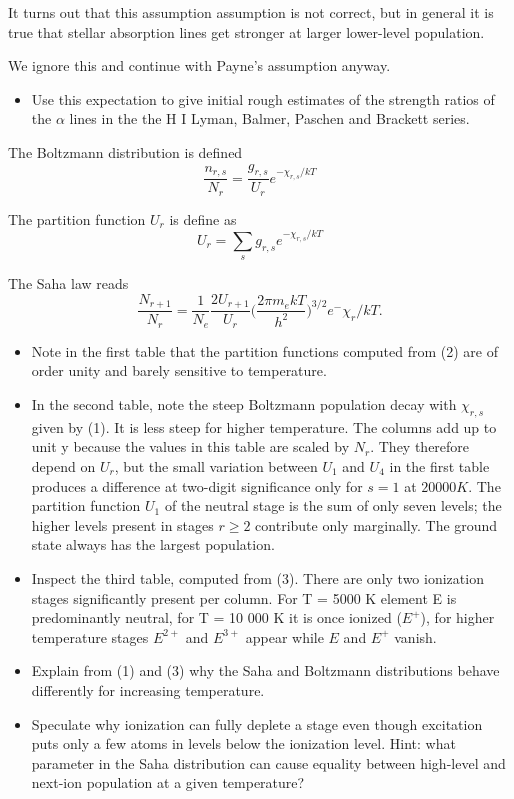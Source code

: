 \documentclass{aa}   %
\begin{document}
It turns out that this assumption assumption is not correct, but in general it is true that stellar absorption lines get stronger at larger lower-level population. 

We ignore this and continue with Payne's assumption anyway.

\begin{itemize}
 \item 
Use this expectation to give initial rough estimates of the strength ratios of the $\alpha$ lines in the the H I Lyman, Balmer, Paschen and Brackett series.
\end{itemize}

The Boltzmann distribution is defined
\begin{equation}
\frac{n_{r,s}}{N_r} = \frac{g_{r,s}}{U_r} e^{-\chi_{r,s}/kT} 
\end{equation}


The partition function $U_r$ is define as
\begin{equation}
 U_r = \sum_s g_{r,s} e^{-\chi_{r,s}/kT}
\end{equation}


The Saha law reads
\begin{equation}
 \frac{N_{r+1}}{N_r} = \frac{1}{N_e}\frac{2U_{r+1}}{U_r}\bigg(\frac{2\pi m_e kT}{h^2}\bigg)^{3/2} e^-{\chi_r/kT}.
\end{equation}

\begin{itemize}
 \item 
 Note in the first table that the partition functions computed from (2) are of order unity and barely sensitive to temperature.
\item
In the second table, note the steep Boltzmann population decay with $\chi_{r,s}$ given by (1). It is less steep for higher temperature. The columns add up to unit y because the values in this table are scaled by $N_r$. They therefore depend on $U_r$, but the small variation between $U_1$ and $U_4$ in the first table produces a difference at two-digit significance only for $s = 1$ at $20 000 K$. The partition function $U_1$ of the neutral stage is the sum of only seven levels; the higher levels present in stages $r \ge 2$ contribute only marginally. The ground state always has the largest population.
\item
Inspect the third table, computed from (3). There are only two ionization stages significantly present per column. For T = 5000 K element E is predominantly neutral, for T = 10 000 K it is once ionized ($E^+$), for higher temperature stages $E^{2+}$ and $E^{3+}$ appear while $E$ and $E^+$ vanish.
\item
Explain from (1) and (3) why the Saha and Boltzmann distributions behave differently for increasing temperature.
\item
Speculate why ionization can fully deplete a stage even though excitation puts only a few atoms in levels below the ionization level. Hint: what parameter in the Saha distribution can cause equality between high-level and next-ion population at a given temperature?
\end{itemize}
\end{document}
